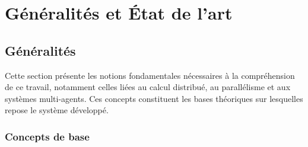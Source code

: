 \documentclass[12pt,a4paper]{report}
\begin{document}
\listoffigures

\listoftables

\chapter{Généralités et État de l'art}

\section{Généralités}

Cette section présente les notions fondamentales nécessaires à la compréhension de ce travail, notamment celles liées au calcul distribué, au parallélisme et aux systèmes multi-agents. Ces concepts constituent les bases théoriques sur lesquelles repose le système développé.

\subsection{Concepts de base}
\end{document}
